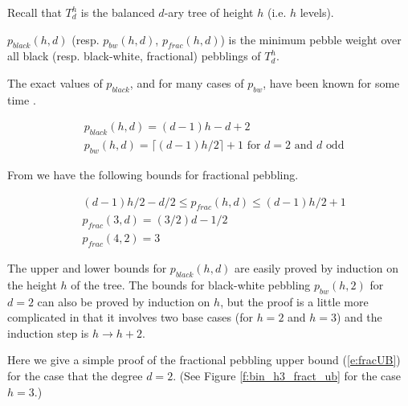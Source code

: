 \documentclass[oribib1]{llncs}
\newcommand{\ra}{\rightarrow}
\begin{document}
Recall that $T^h_d$ is the balanced $d$-ary tree of height $h$
(i.e. $h$ levels).  

\begin{definition}\label{d_p-def}
$p_{black}(h,d)$ (resp. $p_{bw}(h,d)$, $p_{frac}(h,d)$) is the minimum
pebble weight over all black (resp. black-white, fractional) pebblings
of $T^h_d$.
\end{definition}

The exact values of $p_{black}$, and for many cases of $p_{bw}$, have been
known for some time \cite{nord:survey2,c:pebjournal}.

\begin{proposition}\label{p:pebble_value}
\begin{eqnarray}\label{e:black}
  & p_{black}(h,d) = (d-1)h-d+2  \\
  & \mbox{$p_{bw}(h,d) = \lceil(d-1)h/2\rceil +1$ for $d=2$ and $d$ odd}
\end{eqnarray}
\end{proposition}

From \cite{c:pebjournal} we have the following bounds
for fractional pebbling.
\begin{proposition}\label{p:fracvalue}
\begin{eqnarray}\label{e:FracValue}
   & (d-1)h/2-d/2\le p_{frac}(h,d) \le (d-1)h/2+1 \label{e:fracUB}\\
   & p_{frac}(3,d) = (3/2)d-1/2  \\
   & p_{frac}(4,2) = 3
\end{eqnarray}
\end{proposition}
The upper and lower bounds for $p_{black}(h,d)$ are easily proved
by induction on the height $h$ of the tree.  The bounds for black-white
pebbling $p_{bw}(h,2)$ for $d=2$ can also be proved by induction on $h$,
but the proof is a little more complicated in that it involves two
base cases (for $h=2$ and $h=3$) and the induction step is $h\ra h+2$.

Here we give a simple proof of the fractional pebbling upper bound
(\ref{e:fracUB}) for the case that the degree $d = 2$.
(See Figure \ref{f:bin_h3_fract_ub} for the case $h=3$.)
\end{document}
